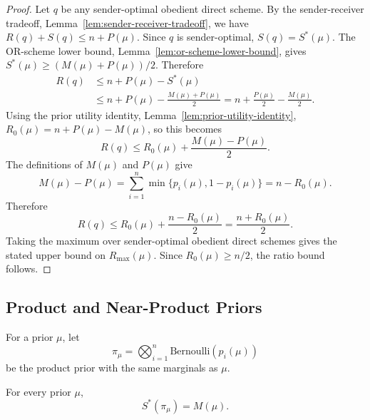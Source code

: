 \documentclass[format=acmsmall, review=false]{acmart}
\begin{document}
\begin{proof}
Let $q$ be any sender-optimal obedient direct scheme. By the sender-receiver
tradeoff, Lemma~\ref{lem:sender-receiver-tradeoff}, we have
$R(q)+S(q)\leq n+P(\mu)$. Since $q$ is sender-optimal, $S(q)=S^*(\mu)$. The
OR-scheme lower bound, Lemma~\ref{lem:or-scheme-lower-bound}, gives
$S^*(\mu)\geq (M(\mu)+P(\mu))/2$. Therefore
\[
\begin{aligned}
R(q)
&\leq n+P(\mu)-S^*(\mu)\\
&\leq n+P(\mu)-\frac{M(\mu)+P(\mu)}{2}
=n+\frac{P(\mu)}{2}-\frac{M(\mu)}{2}.
\end{aligned}
\]
Using the prior utility identity, Lemma~\ref{lem:prior-utility-identity},
$R_0(\mu)=n+P(\mu)-M(\mu)$, so this becomes
\[
R(q)\leq R_0(\mu)+\frac{M(\mu)-P(\mu)}{2}.
\]
The definitions of $M(\mu)$ and $P(\mu)$ give
\[
M(\mu)-P(\mu)
=\sum_{i=1}^n \min\{p_i(\mu),1-p_i(\mu)\}
=n-R_0(\mu).
\]
Therefore
\[
R(q)\leq R_0(\mu)+\frac{n-R_0(\mu)}{2}
=\frac{n+R_0(\mu)}{2}.
\]
Taking the maximum over sender-optimal obedient direct schemes gives the stated
upper bound on $R_{\max}(\mu)$. Since $R_0(\mu)\geq n/2$, the ratio bound
follows.
\end{proof}

\subsection{Product and Near-Product Priors}

For a prior $\mu$, let
\[
\pi_\mu=\bigotimes_{i=1}^n \mathrm{Bernoulli}(p_i(\mu))
\]
be the product prior with the same marginals as $\mu$.

\begin{theorem}
\label{thm:product-prior-sender-value}
For every prior $\mu$,
\[
S^*(\pi_\mu)=M(\mu).
\]
\end{theorem}
\end{document}
